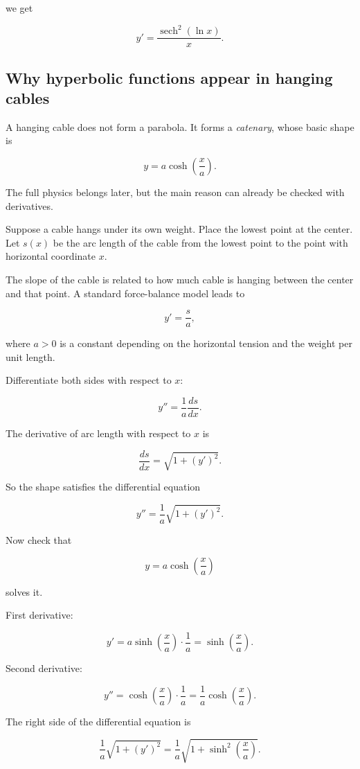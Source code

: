 we get

\[
\boxed{
y'=\frac{\operatorname{sech}^2(\ln x)}{x}.
}
\]

\subsection{Why hyperbolic functions appear in hanging cables}
\label{subsec:hanging-cables-hyperbolic-functions}

A hanging cable does not form a parabola.  It forms a \emph{catenary}, whose basic shape is

\[
y=a\cosh\left(\frac{x}{a}\right).
\]

The full physics belongs later, but the main reason can already be checked with derivatives.

Suppose a cable hangs under its own weight.  Place the lowest point at the center.  Let \(s(x)\) be the arc length of the cable from the lowest point to the point with horizontal coordinate \(x\).

The slope of the cable is related to how much cable is hanging between the center and that point.  A standard force-balance model leads to

\[
y'=\frac{s}{a},
\]

where \(a>0\) is a constant depending on the horizontal tension and the weight per unit length.

Differentiate both sides with respect to \(x\):

\[
y''=\frac1a\frac{ds}{dx}.
\]

The derivative of arc length with respect to \(x\) is

\[
\frac{ds}{dx}=\sqrt{1+(y')^2}.
\]

So the shape satisfies the differential equation

\[
\boxed{
y''=\frac1a\sqrt{1+(y')^2}.
}
\]

Now check that

\[
y=a\cosh\left(\frac{x}{a}\right)
\]

solves it.

First derivative:

\[
y'
=
a\sinh\left(\frac{x}{a}\right)\cdot \frac1a
=
\sinh\left(\frac{x}{a}\right).
\]

Second derivative:

\[
y''
=
\cosh\left(\frac{x}{a}\right)\cdot\frac1a
=
\frac1a\cosh\left(\frac{x}{a}\right).
\]

The right side of the differential equation is

\[
\frac1a\sqrt{1+(y')^2}
=
\frac1a\sqrt{1+\sinh^2\left(\frac{x}{a}\right)}.
\]

